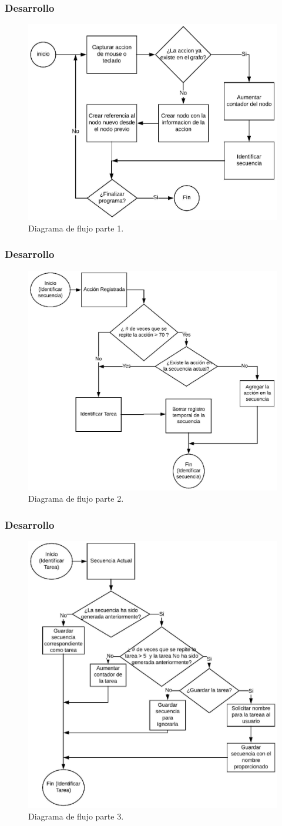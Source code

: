\begin{frame}
\frametitle{Desarrollo}
\begin{figure}[h]
\centering
\includegraphics[height=0.55 \columnwidth]{Imagenes/Concepto1.eps}
\caption{Diagrama de flujo parte 1.}
\label{fig:bloques}
\end{figure}
\end{frame}

\begin{frame}
\frametitle{Desarrollo}
\begin{figure}[h]
\centering
\includegraphics[height=0.55 \columnwidth]{Imagenes/Concepto2.eps}
\caption{Diagrama de flujo parte 2.}
\label{fig:bloques}
\end{figure}
\end{frame}

\begin{frame}
\frametitle{Desarrollo}
\begin{figure}[h]
\centering
\includegraphics[height=0.55 \columnwidth]{Imagenes/Concepto3.eps}
\caption{Diagrama de flujo parte 3.}
\label{fig:bloques}
\end{figure}
\end{frame}


